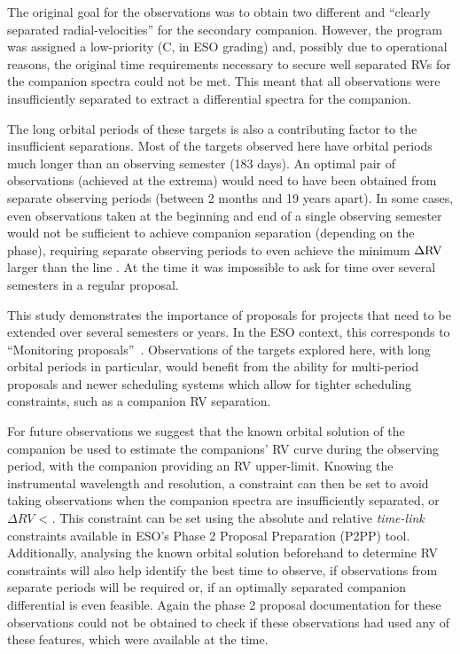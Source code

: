 The original goal for the observations was to obtain two different and ``clearly separated radial-velocities'' for the secondary companion.
However, the program was assigned a low-priority (C, in ESO grading) and, possibly due to operational reasons, the original time requirements necessary to secure well separated RVs for the companion spectra could not be met.
This meant that all observations were insufficiently separated to extract a differential spectra for the companion.

The long orbital periods of these targets is also a contributing factor to the insufficient separations.
Most of the targets observed here have orbital periods much longer than an observing semester (183 days).
An optimal pair of observations (achieved at the extrema) would need to have been obtained from separate observing periods (between 2 months and 19 years apart).
In some cases, even observations taken at the beginning and end of a single observing semester would not be sufficient to achieve companion separation (depending on the phase), requiring separate observing periods to even achieve the minimum \(\Delta \rm {RV}\) larger than the line {\fwhm}.
At the time it was impossible to ask for time over several semesters in a regular proposal.

This study demonstrates the importance of proposals for projects that need to be extended over several semesters or years.
In the ESO context, this corresponds to ``Monitoring proposals''~\citep[e.g.][pg.~18]{eso_eso_2017}.
Observations of the targets explored here, with long orbital periods in particular, would benefit from the ability for multi-period proposals and newer scheduling systems which allow for tighter scheduling constraints, such as a companion {RV} separation.

For future observations we suggest that the known orbital solution of the companion be used to estimate the companions' {RV} curve during the observing period, with the companion \mtwosini{} providing an {RV} upper-limit.
Knowing the instrumental wavelength and resolution, a constraint can then be set to avoid taking observations when the companion spectra are insufficiently separated, or \(\Delta {RV}\) < {\fwhm}. This constraint can be set using the absolute and relative \emph{time-link} constraints available in {ESO}'s {Phase 2 Proposal Preparation} (P2PP) tool.
Additionally, analysing the known orbital solution beforehand to determine {RV} constraints will also help identify the best time to observe, if observations from separate periods will be required or, if an optimally separated companion differential is even feasible. Again the phase 2 proposal documentation for these observations could not be obtained to check if these observations had used any of these features, which were available at the time.





